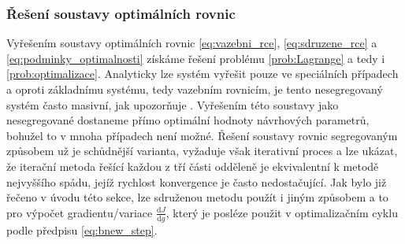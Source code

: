 \subsubsection{Řešení soustavy optimálních rovnic}
Vyřešením soustavy optimálních rovnic \ref{eq:vazebni_rce}, \ref{eq:sdruzene_rce} a \ref{eq:podminky_optimalnosti} získáme řešení problému \ref{prob:Lagrange} a tedy i \ref{prob:optimalizace}. Analyticky lze systém vyřešit pouze ve speciálních případech a oproti základnímu systému, tedy vazebním rovnicím, je tento nesegregovaný systém často masivní, jak upozorňuje \cite{karman1997inverse}. Vyřešením této soustavy jako nesegregované dostaneme přímo optimální hodnoty návrhových parametrů, bohužel to v mnoha případech není možné. Řešení soustavy rovnic segregovaným způsobem už je schůdnější varianta, vyžaduje však iterativní proces a lze ukázat, že iterační metoda řešící každou z tří části odděleně je ekvivalentní k metodě nejvyššího spádu\cite{karman1997inverse}, jejíž rychlost konvergence je často nedostačující. Jak bylo již řečeno v úvodu této sekce, lze sdruženou metodu použít i jiným způsobem a to pro výpočet gradientu/variace $ \frac{\mathrm{d} J}{\mathrm{d} g} $, který je posléze použit v optimalizačním cyklu podle předpisu \ref{eq:bnew_step}.

